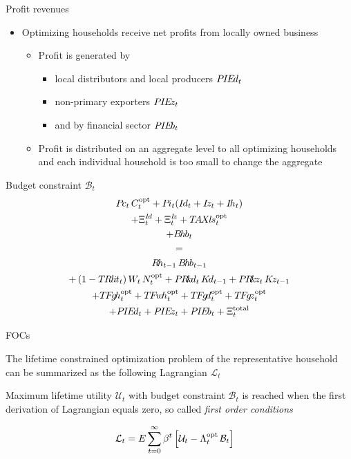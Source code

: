 \begin{frame}{Profit revenues}
  \begin{itemize}
    \item Optimizing households receive net profits from locally owned business
    \begin{itemize}
      \item Profit is generated by 
      \begin{itemize}
        \item local distributors and local producers $P\hspace{-0.10em}I\hspace{-0.10em}E\hspace{-0.15em}d_t$
        \item non-primary exporters $P\hspace{-0.10em}I\hspace{-0.10em}E\hspace{-0.15em}z_t$ 
        \item and by financial sector $P\hspace{-0.10em}I\hspace{-0.10em}E\hspace{-0.15em}b_t$
      \end{itemize}
      \item Profit is distributed on an aggregate level to all optimizing households and each individual household is too small to change the aggregate
    \end{itemize}
  \end{itemize}
\end{frame}


\begin{frame}{Budget constraint $\mathcal{B}_t$}
  \vspace{-5mm}
  \small
  \begin{gather*}    
    \Pc_t \, C^\opt_t + \Pii_t (\Id_t + \Iz_t +\Ih_t) \\
    + \Xi^{\Id}_t + \Xi^{\Iz}_t + \TAXls^{\opt}_t \\
    + \Bhb_t \\ = \\
    \Rh_{t-1}\,\Bhb_{t-1} \\
    + \left(1 - \TRlit_t\right) W_t\, N^\opt_t + \PRkd_t \, \Kd_{t-1} + \PRkz_t \, \Kz_{t-1} \\
    +  \TFgh^{\opt}_t + \TFwh^{\opt}_t + \TFgd^{\opt}_t + \TFgz^{\opt}_t \\
    + \PIEd_t + \PIEz_t + \PIEb_t + \Xi_t^{\text{total}}
  \end{gather*}
\end{frame}

\begin{frame}{FOCs}
  \begin{itemize}
    {\small
    \item The lifetime constrained optimization problem of the representative household 
    can be summarized as the following Lagrangian $\mathcal{L}_t$
    \item Maximum lifetime utility $\mathcal{U}_t$ with budget constraint $\mathcal{B}_t$ is reached when the first derivation of Lagrangian equals zero, so called \emph{first order conditions}
    }%
  \end{itemize}
  \vspace{-5mm}
  {\small
  \begin{align*}
    \mathcal{L}_t & = E\sum_{t=0}^\infty \beta^t \left[ \mathcal{U}_t - \Lambda^\opt_t \, \mathcal{B}_t \right] %
  \end{align*}
  }%
\end{frame}


